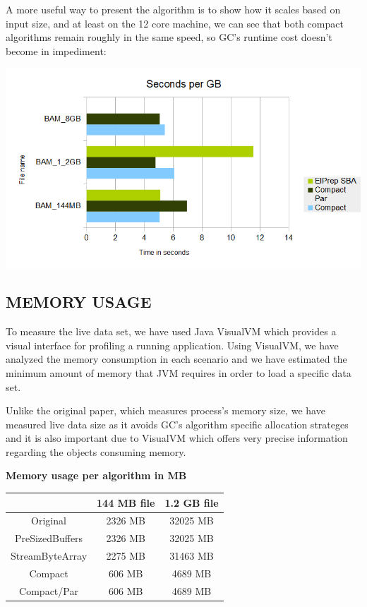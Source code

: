 \documentclass[a4paper,twoside]{article}
\begin{document}
A more useful way to present the algorithm is to show how it scales based on input size, and at least on the 12 core machine, we can see that both compact algorithms remain roughly in the same speed, so GC's runtime cost doesn't become in impediment:

\begin{center}
	\includegraphics[scale=0.5]{images/seconds_per_gb_ryzen.png}
\end{center}



\subsection{\uppercase{Memory Usage}}
\label{subsec:memusage}
To measure the live data set, we have used Java VisualVM \cite{visualvm:oracle} which provides a visual interface for profiling a running application. Using VisualVM, we have analyzed the memory consumption in each scenario and we have estimated the minimum amount of memory that JVM requires in order to load a specific data set.

Unlike the original paper, which measures process's memory size, we have measured live data size as it avoids GC's algorithm specific allocation strateges and it is also important due to VisualVM which offers very precise information regarding the objects consuming memory.


\begin{small}
\begin{center}
\textbf{Memory usage per algorithm in MB} \\
	\begin{tabular}{|c|c|c|}
		\hline			  	& 144 MB file		& 1.2 GB file		\\ \hline
		Original			& 2326 MB			& 32025 MB			\\ \hline
		PreSizedBuffers		& 2326 MB			& 32025 MB			\\ \hline
		StreamByteArray 	& 2275 MB			& 31463 MB			\\ \hline
		Compact 			& 606 MB			& 4689 MB			\\ \hline
		Compact/Par			& 606 MB			& 4689 MB			\\ \hline
	\end{tabular}
\end{center}
\end{small}
\end{document}

